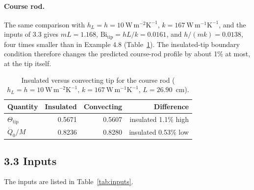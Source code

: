 \documentclass[reprint, amsmath, amssymb, aps, prl]{revtex4-2}
\newcommand{\Qdot}{\dot Q}
\newcommand{\WmK}{\mathrm{W\,m^{-1}K^{-1}}}
\newcommand{\WmmK}{\mathrm{W\,m^{-2}K^{-1}}}
\begin{document}
\paragraph*{Course rod.}
The same comparison with $h_L=h=10~\WmmK$, $k=167~\WmK$, and the inputs of 3.3 gives
$mL=1.168$, $\mathrm{Bi_{tip}}=hL/k=0.0161$, and $h/(mk)=0.0138$, four times smaller than
in Example 4.8 (Table~\ref{tab:tip}). The insulated-tip boundary condition therefore
changes the predicted course-rod profile by about 1\% at most, at the tip itself.

\begin{table}[b]
\caption{\label{tab:tip}Insulated versus convecting tip for the course rod
($h_L=h=10~\WmmK$, $k=167~\WmK$, $L=26.90$~cm).}
\begin{ruledtabular}
\begin{tabular}{lrrr}
Quantity & Insulated & Convecting & Difference \\
\hline
$\Theta_{\mathrm{tip}}$ & 0.5671 & 0.5607 & insulated 1.1\% high \\
$\Qdot_0/M$ & 0.8236 & 0.8280 & insulated 0.53\% low \\
\end{tabular}
\end{ruledtabular}
\end{table}

\subsection*{3.3 Inputs}

The inputs are listed in Table~\ref{tab:inputs}.
\end{document}
